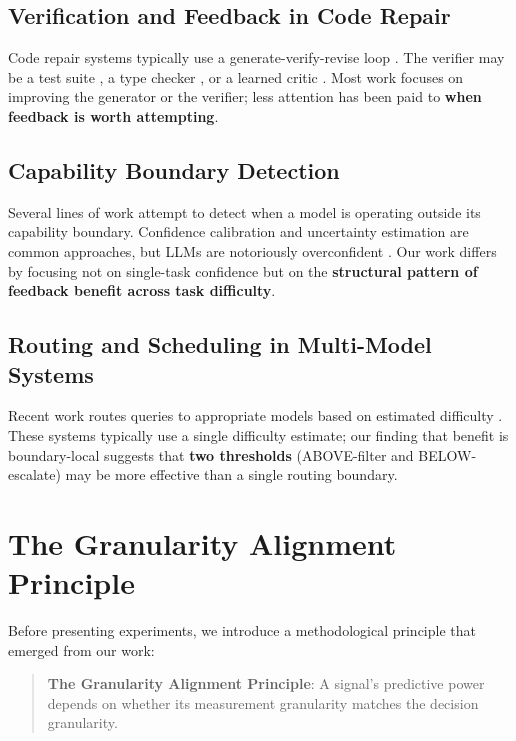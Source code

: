 \documentclass[11pt,a4paper]{article}
\begin{document}
\subsection{Verification and Feedback in Code Repair}

Code repair systems typically use a generate-verify-revise loop \citep{gupta2023grace, yasunaga2020graph}. The verifier may be a test suite \citep{tufano2019empirical}, a type checker \citep{dinella2020hoppity}, or a learned critic \citep{ye2023llm}. Most work focuses on improving the generator or the verifier; less attention has been paid to \textbf{when feedback is worth attempting}.

\subsection{Capability Boundary Detection}

Several lines of work attempt to detect when a model is operating outside its capability boundary. Confidence calibration \citep{guo2017calibration} and uncertainty estimation \citep{lakshminarayanan2017simple} are common approaches, but LLMs are notoriously overconfident \citep{xiong2023uncertainty}. Our work differs by focusing not on single-task confidence but on the \textbf{structural pattern of feedback benefit across task difficulty}.

\subsection{Routing and Scheduling in Multi-Model Systems}

Recent work routes queries to appropriate models based on estimated difficulty \citep{ding2024routellm, shnitzer2023cascades}. These systems typically use a single difficulty estimate; our finding that benefit is boundary-local suggests that \textbf{two thresholds} (ABOVE-filter and BELOW-escalate) may be more effective than a single routing boundary.

\section{The Granularity Alignment Principle}

Before presenting experiments, we introduce a methodological principle that emerged from our work:

\begin{quote}
\textbf{The Granularity Alignment Principle}: A signal's predictive power depends on whether its measurement granularity matches the decision granularity.
\end{quote}
\end{document}
